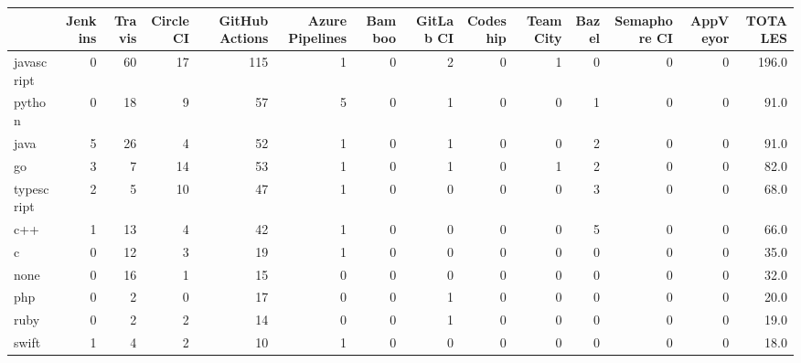 \begin{tabular}{lrrrrrrrrrrrrr}
\toprule
{} &  Jenkins &  Travis &  Circle CI &  GitHub Actions &  Azure Pipelines &  Bamboo &  GitLab CI &  Codeship &  TeamCity &  Bazel &  Semaphore CI &  AppVeyor &  TOTALES \\
\midrule
javascript    &        0 &      60 &         17 &             115 &                1 &       0 &          2 &         0 &         1 &      0 &             0 &         0 &    196.0 \\
python        &        0 &      18 &          9 &              57 &                5 &       0 &          1 &         0 &         0 &      1 &             0 &         0 &     91.0 \\
java          &        5 &      26 &          4 &              52 &                1 &       0 &          1 &         0 &         0 &      2 &             0 &         0 &     91.0 \\
go            &        3 &       7 &         14 &              53 &                1 &       0 &          1 &         0 &         1 &      2 &             0 &         0 &     82.0 \\
typescript    &        2 &       5 &         10 &              47 &                1 &       0 &          0 &         0 &         0 &      3 &             0 &         0 &     68.0 \\
c++           &        1 &      13 &          4 &              42 &                1 &       0 &          0 &         0 &         0 &      5 &             0 &         0 &     66.0 \\
c             &        0 &      12 &          3 &              19 &                1 &       0 &          0 &         0 &         0 &      0 &             0 &         0 &     35.0 \\
none          &        0 &      16 &          1 &              15 &                0 &       0 &          0 &         0 &         0 &      0 &             0 &         0 &     32.0 \\
php           &        0 &       2 &          0 &              17 &                0 &       0 &          1 &         0 &         0 &      0 &             0 &         0 &     20.0 \\
ruby          &        0 &       2 &          2 &              14 &                0 &       0 &          1 &         0 &         0 &      0 &             0 &         0 &     19.0 \\
swift         &        1 &       4 &          2 &              10 &                1 &       0 &          0 &         0 &         0 &      0 &             0 &         0 &     18.0 \\

\end{tabular}
